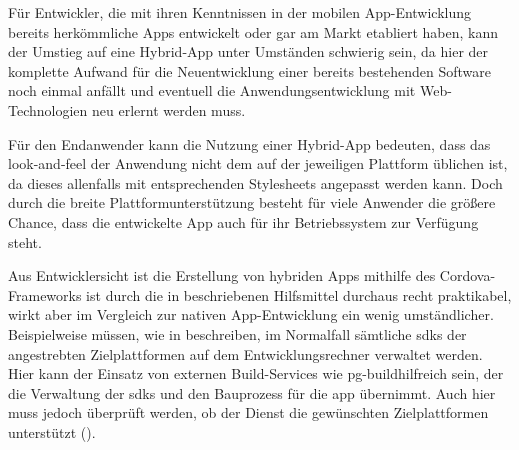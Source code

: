 
Für Entwickler, die mit ihren Kenntnissen in der mobilen App-Entwicklung bereits herkömmliche Apps entwickelt oder gar am Markt etabliert haben, kann der Umstieg auf eine Hybrid-App unter Umständen schwierig sein, da hier der komplette Aufwand für die Neuentwicklung einer bereits bestehenden Software noch einmal anfällt und eventuell die Anwendungsentwicklung mit Web-Technologien neu erlernt werden muss.





Für den Endanwender kann die Nutzung einer Hybrid-App bedeuten, dass das \gls{look-and-feel} der Anwendung nicht dem auf der jeweiligen Plattform üblichen ist, da dieses allenfalls mit entsprechenden Stylesheets angepasst werden kann.
Doch durch die breite Plattformunterstützung besteht für viele Anwender die größere Chance, dass die entwickelte App auch für ihr Betriebssystem zur Verfügung steht.


Aus Entwicklersicht ist die Erstellung von hybriden Apps mithilfe des Cordova-Frameworks ist durch die in  beschriebenen Hilfsmittel durchaus recht praktikabel, wirkt aber im Vergleich zur nativen App-Entwicklung ein wenig umständlicher. 
Beispielweise müssen, wie in  beschreiben, im Normalfall sämtliche \glspl{sdk} der angestrebten Zielplattformen auf dem Entwicklungsrechner verwaltet werden.
Hier kann der Einsatz von externen Build-Services wie \gls{pg-build}hilfreich sein, der die Verwaltung der \glspl{sdk} und den Bauprozess für die \gls{app} übernimmt.
Auch hier muss jedoch überprüft werden, ob der Dienst die gewünschten Zielplattformen unterstützt ().


